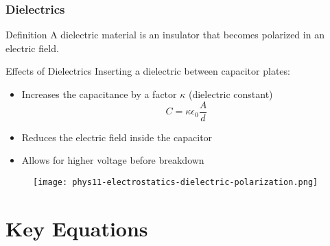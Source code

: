 \documentclass{beamer}
\begin{document}
\begin{frame}
    \frametitle{Dielectrics}
    \begin{block}{Definition}
        A dielectric material is an insulator that becomes polarized in an electric field.
    \end{block}
    
    \begin{block}{Effects of Dielectrics}
        Inserting a dielectric between capacitor plates:
        \begin{itemize}
            \item Increases the capacitance by a factor $\kappa$ (dielectric constant)
            \begin{equation}
                C = \kappa \epsilon_0 \frac{A}{d}
            \end{equation}
            \item Reduces the electric field inside the capacitor
            \item Allows for higher voltage before breakdown
        \end{itemize}
    \end{block}
    \end{frame}

\begin{frame}
    
      \begin{figure}
          \centering
          \texttt{[image: phys11-electrostatics-dielectric-polarization.png]}
      \end{figure}
    
\end{frame}

\section{Key Equations}
\end{document}
